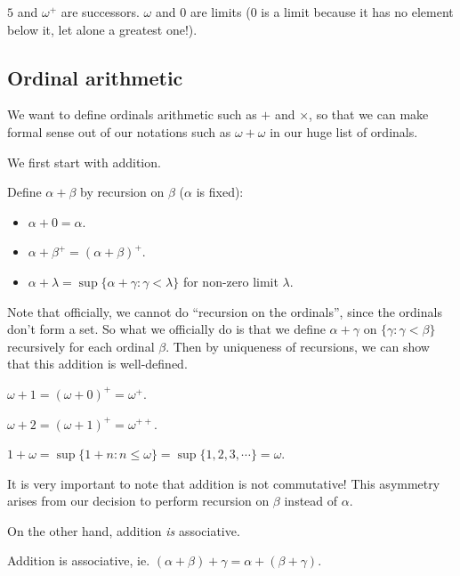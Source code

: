 \documentclass[a4paper]{article}
\begin{document}
\begin{eg}
  $5$ and $\omega^+$ are successors. $\omega$ and $0$ are limits ($0$ is a limit because it has no element below it, let alone a greatest one!).
\end{eg}

\subsection{Ordinal arithmetic}
We want to define ordinals arithmetic such as $+$ and $\times$, so that we can make formal sense out of our notations such as $\omega + \omega$ in our huge list of ordinals.

We first start with addition.
\begin{defi}
  Define $\alpha + \beta$ by recursion on $\beta$ ($\alpha$ is fixed):
  \begin{itemize}
    \item $\alpha + 0 = \alpha$.
    \item $\alpha + \beta^+ = (\alpha + \beta)^+$.
    \item $\alpha + \lambda = \sup \{\alpha + \gamma: \gamma < \lambda\}$ for non-zero limit $\lambda$.
  \end{itemize}
\end{defi}
Note that officially, we cannot do ``recursion on the ordinals'', since the ordinals don't form a set. So what we officially do is that we define $\alpha + \gamma$ on $\{\gamma: \gamma < \beta\}$ recursively for each ordinal $\beta$. Then by uniqueness of recursions, we can show that this addition is well-defined.

\begin{eg}
  $\omega + 1 = (\omega + 0)^+ = \omega^+$.

  $\omega + 2 = (\omega + 1)^+ = \omega^{++}$.

  $1 + \omega = \sup\{ 1 + n: n \leq \omega\} = \sup\{1, 2, 3, \cdots\} = \omega$.
\end{eg}
It is very important to note that addition is not commutative! This asymmetry arises from our decision to perform recursion on $\beta$ instead of $\alpha$.

On the other hand, addition \emph{is} associative.
\begin{prop}
  Addition is associative, ie. $(\alpha + \beta) + \gamma = \alpha + (\beta + \gamma)$.
\end{prop}
\end{document}
